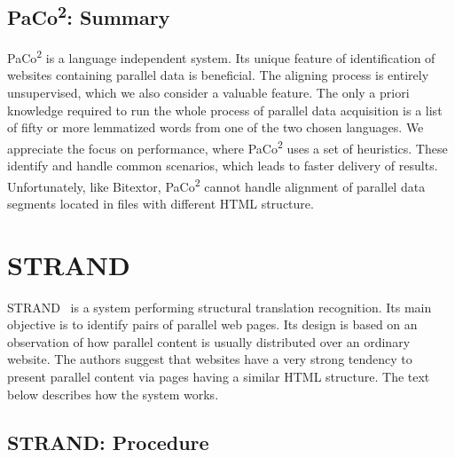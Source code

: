 \subsection{PaCo\textsuperscript{2}: Summary}
\label{subsection:paco2_summary}

PaCo\textsuperscript{2} is a language independent system. Its unique feature of identification of websites containing parallel data is beneficial. The aligning process is entirely unsupervised, which we also consider a valuable feature. The only a priori knowledge required to run the whole process of parallel data acquisition is a list of fifty or more lemmatized words from one of the two chosen languages. We appreciate the focus on performance, where PaCo\textsuperscript{2} uses a set of heuristics. These identify and handle common scenarios, which leads to faster delivery of results. Unfortunately, like Bitextor, PaCo\textsuperscript{2} cannot handle alignment of parallel data segments located in files with different HTML structure. 

\section{STRAND}
\label{section:strand}

STRAND~\cite{Resnik03}\cite{Resnik99}\cite{Resnik98} is a system performing structural translation recognition. Its main objective is to identify pairs of parallel web pages. Its design is based on an observation of how parallel content is usually distributed over an ordinary website. The authors suggest that websites have a very strong tendency to present parallel content via pages having a similar HTML structure. The text below describes how the system works.

\subsection{STRAND: Procedure}
\label{subsection:strand_procedure}

